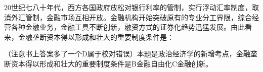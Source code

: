 \question 20世纪七八十年代，西方各国政府放松对银行利率的管制，实行浮动汇率制度，取消外汇管制，金融市场互相开放。金融机构开始突破原有的专业分工界限，综合经营各种金融业务，金融工具不断创新，融资方式的证券化趋势迅猛发展。由此看来，金融垄断资本得以形成和壮大的重要制度条件是：
\par{}
\begin{solution}（注意书上答案多了一个D属于校对错误）本题是政治经济学的新增考点，金融垄断资本得以形成和壮大的重要制度条件是B金融自由化C金融创新。
\end{solution}
